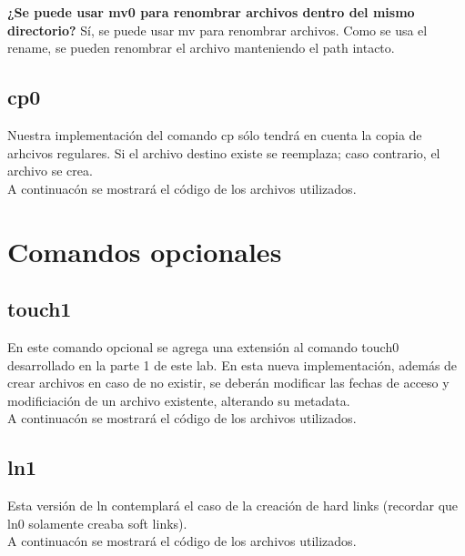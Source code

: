 \documentclass[a4paper, 12pt]{article}
\begin{document}
		\textbf{¿Se puede usar mv0 para renombrar archivos dentro del mismo directorio?} Sí, se puede usar mv para renombrar archivos. Como se usa el rename, se pueden renombrar el archivo manteniendo el path intacto.
		
		\subsection{cp0}
		Nuestra implementación del comando cp sólo tendrá en cuenta la copia de arhcivos regulares. Si el archivo destino existe se reemplaza; caso contrario, el archivo se crea. \\
		A continuacón se mostrará el código de los archivos utilizados.
		
		\bigskip\bigskip\bigskip
		
		
	\newpage
	\section{Comandos opcionales}
		\subsection{touch1}
		En este comando opcional se agrega una extensión al comando touch0 desarrollado en la parte 1 de este lab. En esta nueva implementación, además de crear archivos en caso de no existir, se deberán modificar las fechas de acceso y modificiación de un archivo existente, alterando su metadata.\\
		A continuacón se mostrará el código de los archivos utilizados.
		
		\bigskip\bigskip\bigskip
		
		
	\subsection{ln1}
		Esta versión de ln contemplará el caso de la creación de hard links (recordar que ln0 solamente creaba soft links).\\
		A continuacón se mostrará el código de los archivos utilizados.
		
		\bigskip\bigskip\bigskip
		
		
\end{document}
